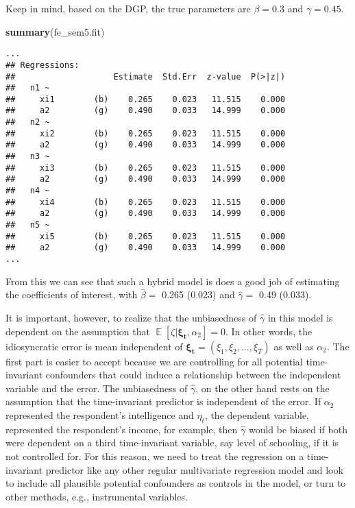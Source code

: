 \documentclass[]{interact}
\theoremstyle{plain}%
\theoremstyle{definition}
\theoremstyle{remark}
\newenvironment{Shaded}{\begin{snugshade}}{\end{snugshade}}
\newcommand{\KeywordTok}[1]{\textcolor[rgb]{0.13,0.29,0.53}{\textbf{#1}}}
\newcommand{\NormalTok}[1]{#1}
\begin{document}
Keep in mind, based on the DGP, the true parameters are \(\beta = 0.3\)
and \(\gamma = 0.45\).

\singlespacing

\begin{Shaded}
\begin{Highlighting}[]
\KeywordTok{summary}\NormalTok{(fe\_sem5.fit)}
\end{Highlighting}
\end{Shaded}

\begin{verbatim}
...
## Regressions:
##                    Estimate  Std.Err  z-value  P(>|z|)
##   n1 ~                                                
##     xi1        (b)    0.265    0.023   11.515    0.000
##     a2         (g)    0.490    0.033   14.999    0.000
##   n2 ~                                                
##     xi2        (b)    0.265    0.023   11.515    0.000
##     a2         (g)    0.490    0.033   14.999    0.000
##   n3 ~                                                
##     xi3        (b)    0.265    0.023   11.515    0.000
##     a2         (g)    0.490    0.033   14.999    0.000
##   n4 ~                                                
##     xi4        (b)    0.265    0.023   11.515    0.000
##     a2         (g)    0.490    0.033   14.999    0.000
##   n5 ~                                                
##     xi5        (b)    0.265    0.023   11.515    0.000
##     a2         (g)    0.490    0.033   14.999    0.000
...
\end{verbatim}

\doublespacing

From this we can see that such a hybrid model is does a good job of
estimating the coefficients of interest, with \(\hat{\beta} =\) 0.265
(0.023) and \(\hat{\gamma} =\) 0.49 (0.033).

It is important, however, to realize that the unbiasedness of
\(\hat{\gamma}\) in this model is dependent on the assumption that
\(\mathop{\mathrm{\mathbb{E}}}[\zeta | \bm{\xi_{t}}, \alpha_{2}] = 0\).
In other words, the idiosyncratic error is mean independent of
\(\bm{\xi_{t}} = (\xi_{1}, \xi_{2}, ..., \xi_{T})\) as well as
\(\alpha_{2}\). The first part is easier to accept because we are
controlling for all potential time-invariant confounders that could
induce a relationship between the independent variable and the error.
The unbiasedness of \(\hat{\gamma}\), on the other hand rests on the
assumption that the time-invariant predictor is independent of the
error. If \(\alpha_{2}\) represented the respondent's intelligence and
\(\eta_{t}\), the dependent variable, represented the respondent's
income, for example, then \(\hat{\gamma}\) would be biased if both were
dependent on a third time-invariant variable, say level of schooling, if
it is not controlled for. For this reason, we need to treat the
regression on a time-invariant predictor like any other regular
multivariate regression model and look to include all plausible
potential confounders as controls in the model, or turn to other
methods, e.g., instrumental variables.
\end{document}
